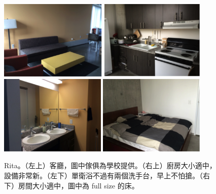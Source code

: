 \documentclass[10pt,a4paper]{book}
\begin{document}
\begin{CJK}{UTF8}{bkai}
\begin{enumerate}
\begin{figure}
\centering
\includegraphics[width=0.455\textwidth]{Pics/rita_1}
\includegraphics[width=0.445\textwidth]{Pics/rita_2}\\
\includegraphics[width=0.45\textwidth]{Pics/rita_3}
\includegraphics[width=0.45\textwidth]{Pics/rita_4}
\caption{Rita。（左上）客廳，圖中傢俱為學校提供。（右上）廚房大小適中，設備非常新。（左下）單衛浴不過有兩個洗手台，早上不怕搶。（右下）房間大小適中，圖中為 full size 的床。}\label{fig:rita}
\end{figure}


\end{enumerate}
\end{CJK}
\end{document}
